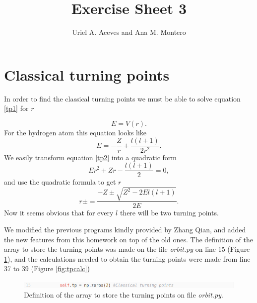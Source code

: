 \documentclass[12pt]{article}
\title{Exercise Sheet 3}
\author{Uriel A. Aceves and Ana M. Montero}
\begin{document}
\maketitle



\section{Classical turning points}

In order to find the classical turning points we must be able to solve equation \ref{tp1} for $r$

\begin{equation}
    E = V(r).
    \label{tp1}
\end{equation}
For the hydrogen atom this equation looks like
\begin{equation}
    E = -\frac{Z}{r} + \frac{l(l+1)}{2r^2}.
    \label{tp2}
\end{equation}
We easily transform equation \ref{tp2} into a quadratic form
\begin{equation}
    Er^2 +Zr -  \frac{l(l+1)}{2} = 0,
\end{equation}
and use the quadratic formula to get $r$
\begin{equation}
    r\pm = \frac{-Z \pm \sqrt{Z^2 - 2El(l+1)}}{2E}.
    \label{tp3}
\end{equation}
Now it seems obvious that for every $l$ there will be two turning points.

We modified the previous programs kindly provided by Zhang Qian, and added the new features from this homework on top of the old ones. The definition of the array to store the turning points was made on the file \textit{orbit.py} on line 15 (Figure \ref{fig:tpdef}), and the calculations needed to obtain the turning points were made from line 37 to 39 (Figure \ref{fig:tpcalc})

\begin{figure}[h!]
    \centering
    \includegraphics[width=\linewidth]{tp2}
    \caption{Definition of the array to store the turning points on file \textit{orbit.py}.}
    \label{fig:tpdef}
\end{figure}
\end{document}
